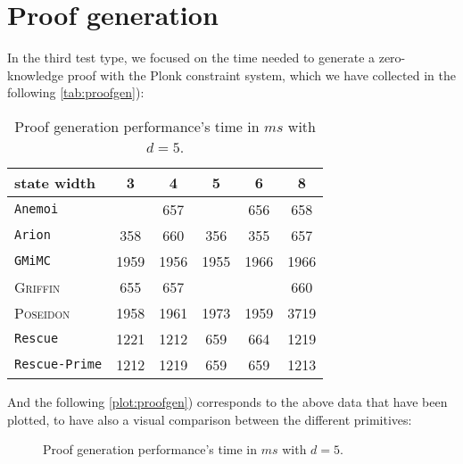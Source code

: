 \documentclass[12pt, a4paper]{report}
\begin{document}
\section{Proof generation}\label{sec:proofgen}

In the third test type, we focused on the time needed to generate a zero-knowledge proof with the Plonk constraint system, which we have collected in the following \autoref{tab:proofgen}):

\begin{table}[H]
  \caption{Proof generation performance's time in $ms$ with $d = 5$.}\label{tab:proofgen}
  \begin{center}
    \begin{tabular}{|l|c|c|c|c|c|}
      \hline
        state width & 3 & 4 & 5 & 6 & 8 \\
      \hline
        \texttt{Anemoi} & & 657 &  & 656 & 658 \\
        \texttt{Arion} & 358 & 660 & 356 & \cellcolor{green!35} 355 & 657 \\
        \texttt{GMiMC} & \cellcolor{orange!35} 1959 & \cellcolor{orange!35} 1956 & \cellcolor{orange!35} 1955 & \cellcolor{orange!35} 1966 & \cellcolor{orange!35} 1966 \\
        \textsc{Griffin} & 655 & 657 & & & 660 \\
        \textsc{Poseidon} & \cellcolor{orange!35} 1958 & \cellcolor{orange!35} 1961 & \cellcolor{orange!35} 1973 & \cellcolor{orange!35} 1959 & \cellcolor{red!35} 3719 \\
        \texttt{Rescue} & \cellcolor{orange!35} 1221 & \cellcolor{orange!35} 1212 & 659 & 664 & \cellcolor{orange!35} 1219 \\
        \texttt{Rescue-Prime} & \cellcolor{orange!35} 1212 & \cellcolor{orange!35} 1219 & 659 & 659 & \cellcolor{orange!35} 1213 \\
      \hline
    \end{tabular}
  \end{center}
\end{table}

And the following \autoref{plot:proofgen}) corresponds to the above data that have been plotted, to have also a visual comparison between the different primitives:

\begin{figure}[H]
  \hspace{60pt}
  \caption{Proof generation performance's time in $ms$ with $d = 5$.}\label{plot:proofgen}
\end{figure}
\end{document}
